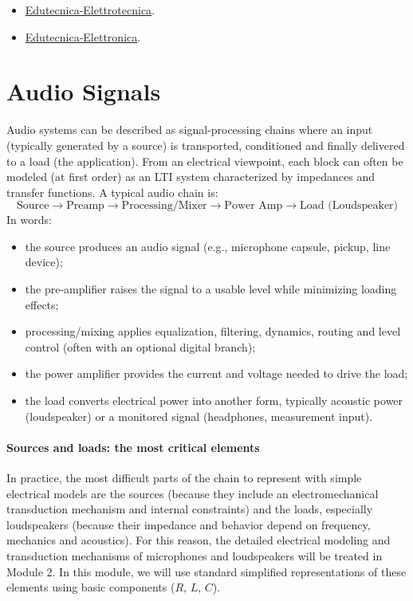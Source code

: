 \begin{itemize}
    \item \href{https://www.edutecnica.it/elettrotecnica.htm}{Edutecnica-Elettrotecnica}.
    \item \href{https://www.edutecnica.it/elettronica.htm}{Edutecnica-Elettronica}.
\end{itemize} 

\section{Audio Signals}

Audio systems can be described as signal-processing chains where an input (typically generated by a source) is transported, conditioned and finally delivered to a load (the application). From an electrical viewpoint, each block can often be modeled (at first order) as an LTI system characterized by impedances and transfer functions. A typical audio chain is:
\[
\text{Source} \rightarrow \text{Preamp} \rightarrow \text{Processing/Mixer} \rightarrow \text{Power Amp} \rightarrow \text{Load (Loudspeaker)}
\]
In words:

\begin{itemize}
    \item the source produces an audio signal (e.g., microphone capsule, pickup, line device);
    \item the pre-amplifier raises the signal to a usable level while minimizing loading effects;
    \item processing/mixing applies equalization, filtering, dynamics, routing and level control (often with an optional digital branch);
    \item the power amplifier provides the current and voltage needed to drive the load;
    \item the load converts electrical power into another form, typically acoustic power (loudspeaker) or a monitored signal (headphones, measurement input).
\end{itemize}

\paragraph{Sources and loads: the most critical elements} In practice, the most difficult parts of the chain to represent with simple electrical models are the sources (because they include an electromechanical transduction mechanism and internal constraints) and the loads, especially loudspeakers (because their impedance and behavior depend on frequency, mechanics and acoustics). For this reason, the detailed electrical modeling and transduction mechanisms of microphones and loudspeakers will be treated in Module 2. In this module, we will use standard simplified representations of these elements using basic components (\(R\), \(L\), \(C\)).

